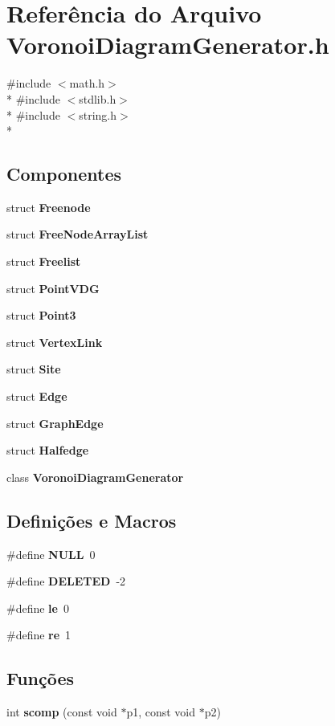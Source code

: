 \section{Referência do Arquivo Voronoi\+Diagram\+Generator.\+h}
\label{_voronoi_diagram_generator_8h}
{\ttfamily \#include $<$math.\+h$>$}\\*
{\ttfamily \#include $<$stdlib.\+h$>$}\\*
{\ttfamily \#include $<$string.\+h$>$}\\*
\subsection*{Componentes}
\begin{DoxyCompactItemize}
\item 
struct {\bf Freenode}
\item 
struct {\bf Free\+Node\+Array\+List}
\item 
struct {\bf Freelist}
\item 
struct {\bf Point\+V\+DG}
\item 
struct {\bf Point3}
\item 
struct {\bf Vertex\+Link}
\item 
struct {\bf Site}
\item 
struct {\bf Edge}
\item 
struct {\bf Graph\+Edge}
\item 
struct {\bf Halfedge}
\item 
class {\bf Voronoi\+Diagram\+Generator}
\end{DoxyCompactItemize}
\subsection*{Definições e Macros}
\begin{DoxyCompactItemize}
\item 
\#define {\bf N\+U\+LL}~0
\item 
\#define {\bf D\+E\+L\+E\+T\+ED}~-\/2
\item 
\#define {\bf le}~0
\item 
\#define {\bf re}~1
\end{DoxyCompactItemize}
\subsection*{Funções}
\begin{DoxyCompactItemize}
\item 
int {\bf scomp} (const void $\ast$p1, const void $\ast$p2)
\end{DoxyCompactItemize}
